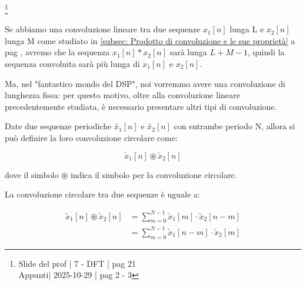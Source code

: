 \footnote{ 
    Slide del prof | 7 - DFT | pag 21\\
    Appunti| 2025-10-29 | pag 2 - 3
}

\begin{tcolorbox}
    Se abbiamo una convoluzione lineare tra due sequenze $x_1 \left[ n\right]$ lunga L e $x_2 \left[ n\right]$ lunga M 
    come studiato in \ref{subsec: Prodotto di convoluzione e le sue proprietà}  a pag \pageref{subsec: Prodotto di convoluzione e le sue proprietà}, 
    avremo che la sequenza $x_1 \left[ n\right] * x_2 \left[ n\right]$ sarà lunga $L + M -1$, quindi la sequenza convoluita sarà più lunga di $x_1 \left[ n\right]$ e $x_2 \left[ n\right]$. \newline 
    
    Ma, nel "fantastico mondo del DSP", noi vorremmo avere una convoluzione di lunghezza fissa: per questo motivo, oltre alla convoluzione lineare precedentemente studiata, 
    è necessario presentare altri tipi di convoluzione. 
\end{tcolorbox}

Date due sequenze periodiche $\tilde{x_1} \left[ n\right]$ e $\tilde{x_2} \left[ n\right]$ con entrambe periodo N, 
allora si può definire la loro convoluzione circolare come: 

{
    \Large 
    \begin{equation}
        \tilde{x}_1 \left[ n\right] 
        \circledast
        \tilde{x}_2 \left[ n\right] 
    \end{equation}
}

dove il simbolo $\circledast$ indica il simbolo per la convoluzione circolare. \newline 

La convoluzione circolare tra due sequenze è uguale a: 

{
    \Large 
    \begin{equation}
        \begin{split}
        \tilde{x}_1 \left[ n\right] 
        \circledast
        \tilde{x}_2 \left[ n\right]
        &= 
        \sum_{m = 0}^{N -1}
        \tilde{x}_1 \left[ m\right] 
        \cdot
        \tilde{x}_2 \left[ n - m\right]
        \\
        &= 
        \sum_{m = 0}^{N -1}
        \tilde{x}_1 \left[ n - m\right] 
        \cdot
        \tilde{x}_2 \left[ m\right]  
        \end{split}
    \end{equation}
}

